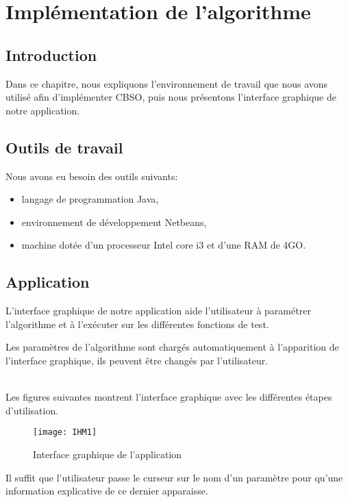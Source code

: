 \chapter {Implémentation de l'algorithme}
\section*{Introduction}
Dans ce chapitre, nous expliquons l'environnement de travail que nous avons utilisé afin d'implémenter CBSO, puis nous présentons l'interface graphique de notre application.\\

\section{Outils de travail}
Nous avons eu besoin des outils suivants:

\begin{itemize}
	\item langage de programmation Java,
	\item environnement de développement Netbeans,
	\item machine dotée d'un processeur Intel core i3 et d'une RAM de 4GO. 
\end{itemize}

\bigskip

\section{Application}
L'interface graphique de notre application aide l'utilisateur à paramétrer l'algorithme et à l'exécuter sur les différentes fonctions de test.

Les paramètres de l'algorithme sont chargés automatiquement à l'apparition de l'interface graphique, ils peuvent être changés par l'utilisateur.\\\\
\bigskip\bigskip\bigskip
\vspace{6em}

Les figures suivantes montrent l'interface graphique avec les différentes étapes d'utilisation.

\begin{figure}[H]
	\centering
	\texttt{[image: IHM1]}
	\caption{Interface graphique de l'application}
\end{figure}

\bigskip \bigskip 
Il suffit que l'utilisateur passe le curseur sur le nom d'un paramètre pour qu'une information explicative de ce dernier apparaisse.\\\\



